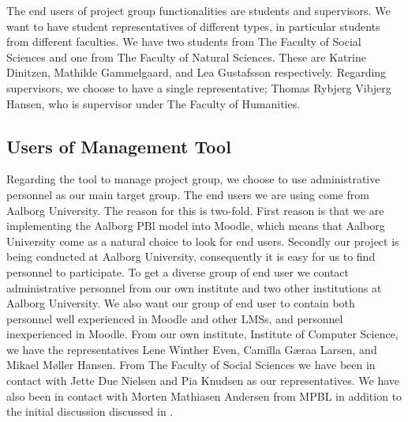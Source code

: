 The end users of project group functionalities are students and supervisors.
We want to have student representatives of different types, in particular students from different faculties.
We have two students from The Faculty of Social Sciences and one from The Faculty of Natural Sciences.
These are Katrine Dinitzen, Mathilde Gammelgaard, and Lea Gustafsson respectively.
Regarding supervisors, we choose to have a single representative; Thomas Rybjerg Vibjerg Hansen, who is supervisor under The Faculty of Humanities.

\subsection{Users of Management Tool}
Regarding the tool to manage project group, we choose to use administrative personnel as our main target group.
The end users we are using come from Aalborg University.
The reason for this is two-fold.
First reason is that we are implementing the Aalborg PBl model into Moodle, which means that Aalborg University come as a natural choice to look for end users.
Secondly our project is being conducted at Aalborg University, consequently it is easy for us to find personnel to participate.
To get a diverse group of end user we contact administrative personnel from our own institute and two other institutions at Aalborg University.
We also want our group of end user to contain both personnel well experienced in Moodle and other LMSs, and personnel inexperienced in Moodle.
From our own institute, Institute of Computer Science, we have the representatives Lene Winther Even, Camilla G\ae{}raa Larsen, and Mikael M\o{}ller Hansen.
From The Faculty of Social Sciences we have been in contact with  Jette Due Nielsen and Pia Knudsen as our representatives.
We have also been in contact with Morten Mathiasen Andersen from MPBL in addition to the initial discussion discussed in .

